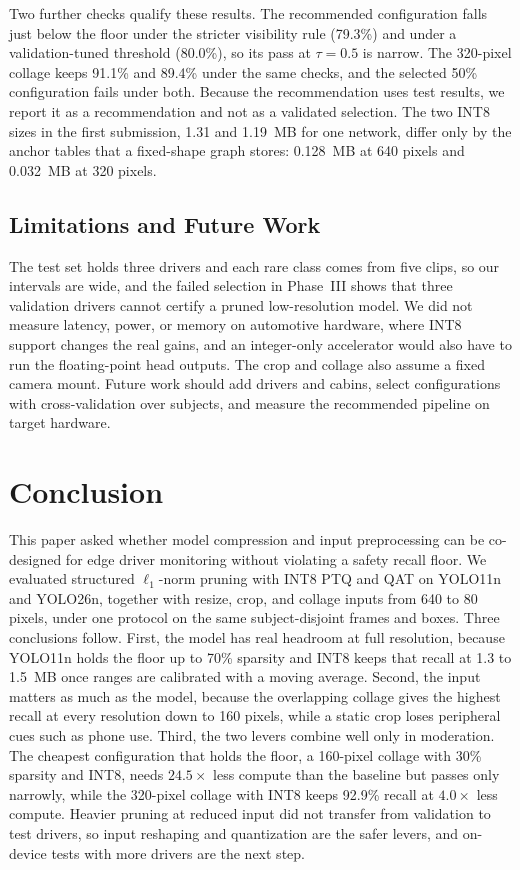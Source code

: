 \documentclass[conference]{IEEEtran}
\begin{document}
Two further checks qualify these results. The recommended configuration falls just below the floor under the stricter visibility rule (79.3\%) and under a validation-tuned threshold (80.0\%), so its pass at $\tau=0.5$ is narrow. The 320-pixel collage keeps 91.1\% and 89.4\% under the same checks, and the selected 50\% configuration fails under both. Because the recommendation uses test results, we report it as a recommendation and not as a validated selection. The two INT8 sizes in the first submission, 1.31 and 1.19~MB for one network, differ only by the anchor tables that a fixed-shape graph stores: 0.128~MB at 640 pixels and 0.032~MB at 320 pixels.

\subsection{Limitations and Future Work}
\label{sec:limitations}
The test set holds three drivers and each rare class comes from five clips, so our intervals are wide, and the failed selection in Phase~III shows that three validation drivers cannot certify a pruned low-resolution model. We did not measure latency, power, or memory on automotive hardware, where INT8 support changes the real gains, and an integer-only accelerator would also have to run the floating-point head outputs. The crop and collage also assume a fixed camera mount. Future work should add drivers and cabins, select configurations with cross-validation over subjects, and measure the recommended pipeline on target hardware.


\section{Conclusion}
This paper asked whether model compression and input preprocessing can be co-designed for edge driver monitoring without violating a safety recall floor. We evaluated structured $\ell_1$-norm pruning with INT8 PTQ and QAT on YOLO11n and YOLO26n, together with resize, crop, and collage inputs from 640 to 80 pixels, under one protocol on the same subject-disjoint frames and boxes. Three conclusions follow. First, the model has real headroom at full resolution, because YOLO11n holds the floor up to 70\% sparsity and INT8 keeps that recall at 1.3 to 1.5~MB once ranges are calibrated with a moving average. Second, the input matters as much as the model, because the overlapping collage gives the highest recall at every resolution down to 160 pixels, while a static crop loses peripheral cues such as phone use. Third, the two levers combine well only in moderation. The cheapest configuration that holds the floor, a 160-pixel collage with 30\% sparsity and INT8, needs $24.5\times$ less compute than the baseline but passes only narrowly, while the 320-pixel collage with INT8 keeps 92.9\% recall at $4.0\times$ less compute. Heavier pruning at reduced input did not transfer from validation to test drivers, so input reshaping and quantization are the safer levers, and on-device tests with more drivers are the next step.
\end{document}
